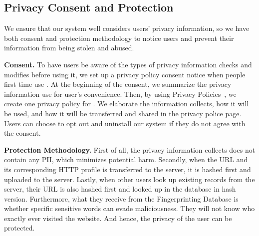 \subsection{Privacy Consent and Protection}

We ensure that our \spartacus system well considers users' privacy information,
so we have both consent and protection methodology to notice users and prevent their information from being stolen and abused.

\noindent
\textbf{Consent.}
To have users be aware of the types of privacy information \spartacus checks and modifies before using it,
we set up a privacy policy consent notice when people first time use \spartacus.
At the beginning of the consent, we summarize the privacy information \spartacus use for user's convenience.
Then, by using Privacy Policies~\cite{privacypolicy}, we create one privacy policy for \spartacus.
We elaborate the information \spartacus collects, how it will be used, and how it will be transferred and shared in the privacy police page.
Users can choose to opt out and uninstall our system if they do not agree with the consent.

\noindent
\textbf{Protection Methodology.}
First of all, the privacy information \spartacus collects does not contain any PII, which minimizes potential harm.
Secondly, when the URL and its corresponding HTTP profile is transferred to the server,
it is hashed first and uploaded to the server.
Lastly, when other users look up existing records from the server,
their URL is also hashed first and looked up in the database in hash version.
Furthermore, what they receive from the Fingerprinting Database is whether specific sensitive words can evade maliciousness.
They will not know who exactly ever visited the website.
And hence, the privacy of the user can be protected.